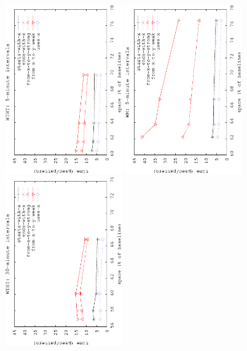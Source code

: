 	\begin{figure}[!ht]
		\begin{center}
			{\includegraphics[angle=-90,width=0.45\textwidth]{figures_synt/madrid_ht5.eps}}
			{\includegraphics[angle=-90,width=0.45\textwidth]{figures_synt/madrid_wm5.eps}}
			{\includegraphics[angle=-90,width=0.45\textwidth]{figures_synt/madrid_ht30.eps}}

\end{center}
\end{figure}
